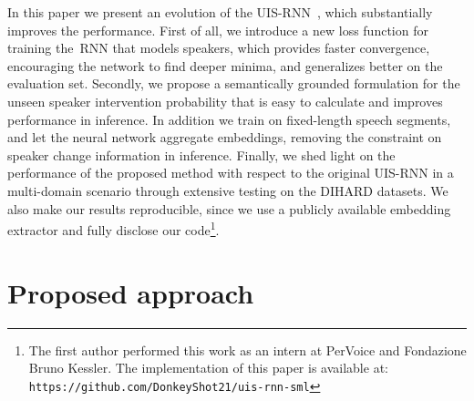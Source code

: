 \documentclass{article}
\begin{document}
In this paper we present an evolution of the UIS-RNN~\cite{zhang2019fully}, which substantially improves the performance. First of all, we introduce a new loss function for training the~\ac{RNN} that models speakers, which provides faster convergence, encouraging the network to find deeper minima, and generalizes better on the evaluation set. Secondly, we propose a semantically grounded formulation for the unseen speaker intervention probability that is easy to calculate and improves performance in inference. In addition we train on fixed-length speech segments, and let the neural network aggregate embeddings,  removing the constraint on speaker change information in inference. Finally, we shed light on the performance of the proposed method with respect to the original UIS-RNN in a multi-domain scenario through extensive testing on the DIHARD datasets. We also make our results reproducible, since we use a publicly available embedding extractor and fully disclose our code\footnote{The first author performed this work as an intern at PerVoice and Fondazione Bruno Kessler. The implementation of this paper is available at:
\tt{https://github.com/DonkeyShot21/uis-rnn-sml}}.





\section{Proposed approach}
\label{sec:proposedapproach}
\end{document}
